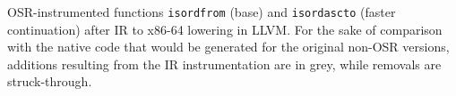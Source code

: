 \label{fig:isordx86-64} OSR-instrumented functions {\tt isordfrom} (base) and {\tt isordascto} (faster continuation) after IR to x86-64 lowering in LLVM. For the sake of comparison with the native code that would be generated for the original non-OSR versions, additions resulting from the IR instrumentation are in grey, while removals are struck-through.